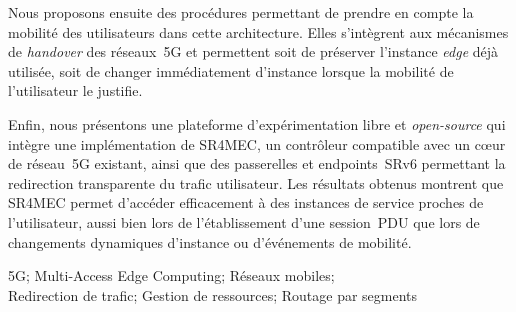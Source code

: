 \documentclass[../main.tex]{subfiles}
\begin{document}
\begin{resume}
\begin{frresume}
Nous proposons ensuite des procédures permettant de prendre en compte la mobilité des utilisateurs dans cette architecture.
Elles s’intègrent aux mécanismes de \textit{handover} des réseaux~5G et permettent soit de préserver l’instance \textit{edge} déjà utilisée, soit de changer immédiatement d’instance lorsque la mobilité de l’utilisateur le justifie.

Enfin, nous présentons une plateforme d’expérimentation libre et \textit{open-source} qui intègre une implémentation de SR4MEC, un contrôleur compatible avec un cœur de réseau~5G existant, ainsi que des passerelles et endpoints~SRv6 permettant la redirection transparente du trafic utilisateur.
Les résultats obtenus montrent que SR4MEC permet d’accéder efficacement à des instances de service proches de l’utilisateur, aussi bien lors de l’établissement d’une session~PDU que lors de changements dynamiques d’instance ou d’événements de mobilité. 
\end{frresume}

\begin{frresumeKeywords}
    5G; Multi-Access Edge Computing; Réseaux mobiles; \\
    Redirection de trafic; Gestion de ressources; Routage par segments
\end{frresumeKeywords}
\end{resume}
\end{document}
